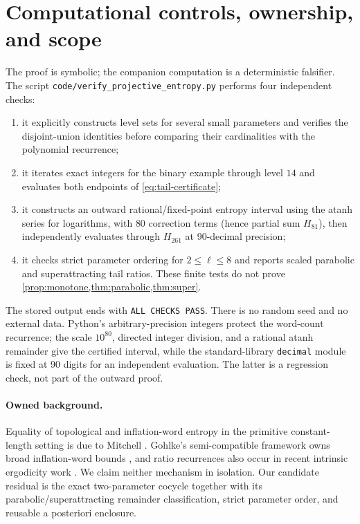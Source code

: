 \section{Computational controls, ownership, and scope}
\label{sec:controls}

The proof is symbolic; the companion computation is a deterministic
falsifier.  The script \texttt{code/verify\_projective\_entropy.py} performs
four independent checks:

\begin{enumerate}
 \item it explicitly constructs level sets for several small parameters and
 verifies the disjoint-union identities before comparing their cardinalities
 with the polynomial recurrence;
 \item it iterates exact integers for the binary example through level $14$
 and evaluates both endpoints of \cref{eq:tail-certificate};
 \item it constructs an outward rational/fixed-point entropy interval using
 the atanh series for logarithms, with $80$ correction terms (hence partial
 sum $H_{81}$), then independently evaluates through $H_{261}$ at
 90-decimal precision;
 \item it checks strict parameter ordering for $2\le\ell\le8$ and reports
 scaled parabolic and superattracting tail ratios.  These finite tests do not
 prove \cref{prop:monotone,thm:parabolic,thm:super}.
\end{enumerate}

The stored output ends with \texttt{ALL CHECKS PASS}.  There is no random
seed and no external data.  Python's arbitrary-precision integers protect the
word-count recurrence; the scale $10^{80}$, directed integer division, and a
rational atanh remainder give the certified interval, while the
standard-library \texttt{decimal} module is fixed at 90 digits for an
independent evaluation.  The latter is a regression check, not part of the
outward proof.

\paragraph{Owned background.}
Equality of topological and inflation-word entropy in the primitive
constant-length setting is due to Mitchell \cite{Mitchell2024}.  Gohlke's
semi-compatible framework owns broad inflation-word bounds
\cite{Gohlke2020}, and ratio recurrences also occur in recent intrinsic
ergodicity work \cite{GohlkeMitchell2026}.  We claim neither mechanism in
isolation.  Our candidate residual is the exact two-parameter cocycle together
with its parabolic/superattracting remainder classification, strict parameter
order, and reusable a posteriori enclosure.

